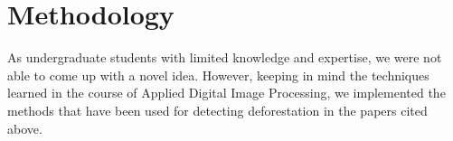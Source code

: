 \documentclass[12pt,a4paper,IEEEtran]{article}
\begin{document}



\section{Methodology}
As undergraduate students with limited knowledge and expertise, we were not able to come up with a novel idea. However, keeping in mind the techniques learned in the course of Applied Digital Image Processing, we implemented the methods that have been used for detecting deforestation in the papers cited above.
\end{document}
